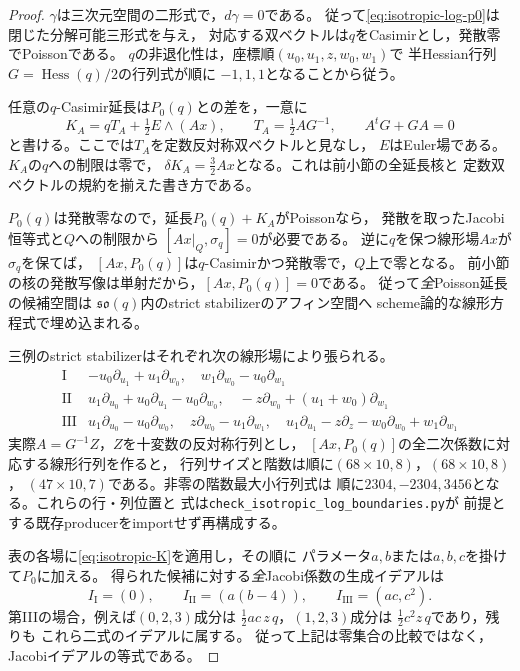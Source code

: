 \begin{proof}
$\gamma$は三次元空間の二形式で，$d\gamma=0$である。
従って\eqref{eq:isotropic-log-p0}は閉じた分解可能三形式を与え，
対応する双ベクトルは$q$をCasimirとし，発散零でPoissonである。
$q$の非退化性は，座標順$(u_0,u_1,z,w_0,w_1)$で
半Hessian行列$G=\operatorname{Hess}(q)/2$の行列式が順に
$-1,1,1$となることから従う。

任意の$q$-Casimir延長は$P_0(q)$との差を，一意に
\[
 K_A=qT_A+\tfrac12 E\wedge(Ax),\qquad
 T_A=\tfrac12 A G^{-1},\qquad A^tG+GA=0
 \tag{K}\label{eq:isotropic-K}
\]
と書ける。ここでは$T_A$を定数反対称双ベクトルと見なし，
$E$はEuler場である。$K_A$の$q$への制限は零で，
$\delta K_A=\tfrac32 Ax$となる。これは前小節の全延長核と
定数双ベクトルの規約を揃えた書き方である。

$P_0(q)$は発散零なので，延長$P_0(q)+K_A$がPoissonなら，
発散を取ったJacobi恒等式と$Q$への制限から
$[Ax|_Q,\sigma_q]=0$が必要である。
逆に$q$を保つ線形場$Ax$が$\sigma_q$を保てば，
$[Ax,P_0(q)]$は$q$-Casimirかつ発散零で，$Q$上で零となる。
前小節の核の発散写像は単射だから，$[Ax,P_0(q)]=0$である。
従って\emph{全}Poisson延長の候補空間は
$\mathfrak{so}(q)$内のstrict stabilizerのアフィン空間へ
scheme論的な線形方程式で埋め込まれる。

三例のstrict stabilizerはそれぞれ次の線形場により張られる。
\[
\begin{array}{c|l}
\mathrm I&-u_0\partial_{u_1}+u_1\partial_{w_0},\quad
               w_1\partial_{w_0}-u_0\partial_{w_1}\\
\mathrm{II}&u_1\partial_{u_0}+u_0\partial_{u_1}-u_0\partial_{w_0},\quad
               -z\partial_{w_0}+(u_1+w_0)\partial_{w_1}\\
\mathrm{III}&u_1\partial_{u_0}-u_0\partial_{w_0},\quad
               z\partial_{w_0}-u_1\partial_{w_1},\quad
               u_1\partial_{u_1}-z\partial_z-w_0\partial_{w_0}+w_1\partial_{w_1}
\end{array}
\]
実際$A=G^{-1}Z$，$Z$を十変数の反対称行列とし，
$[Ax,P_0(q)]$の全二次係数に対応する線形行列を作ると，
行列サイズと階数は順に$(68\times10,8)$，$(68\times10,8)$，
$(47\times10,7)$である。非零の階数最大小行列式は
順に$2304,-2304,3456$となる。これらの行・列位置と
式は\texttt{check\_isotropic\_log\_boundaries.py}が
前提とする既存producerをimportせず再構成する。

表の各場に\eqref{eq:isotropic-K}を適用し，その順に
パラメータ$a,b$または$a,b,c$を掛けて$P_0$に加える。
得られた候補に対する\emph{全}Jacobi係数の生成イデアルは
\[
 I_{\mathrm I}=(0),\qquad
 I_{\mathrm{II}}=(a(b-4)),\qquad
 I_{\mathrm{III}}=(ac,c^2).
\]
第IIIの場合，例えば$(0,2,3)$成分は
$\frac12 ac\,z\,q$，$(1,2,3)$成分は
$\frac12 c^2 z\,q$であり，残りも
これら二式のイデアルに属する。
従って上記は零集合の比較ではなく，Jacobiイデアルの等式である。


\end{proof}
